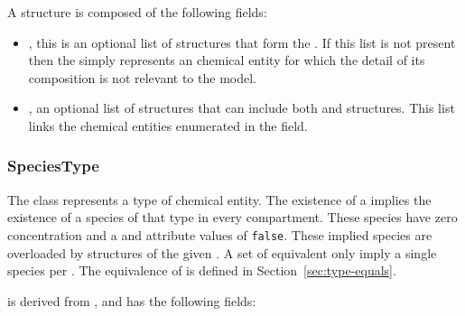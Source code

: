 \documentclass{cekarticle}
\begin{document}
A  structure is composed of the following fields:

\begin{itemize}

\item {}, this is an optional list of 
structures that form the .  If this list is not present
then the  simply represents an chemical entity for which the detail
of its composition is not relevant to the model.

\item {}, an optional list of  structures
that can include both  and 
structures. This list links the chemical entities enumerated in
the  field.

\end{itemize}

\subsubsection{SpeciesType}

\label{sec:class-speciestype}

The class  represents a type of chemical
entity. The existence of a  implies the
existence of a species of that type in every compartment. These
species have zero concentration and a  and
 attribute values of \texttt{false}. These
implied species are overloaded by  structures of
the given .  A set of equivalent
 only imply a single species per
.  The equivalence of  is
defined in Section~\ref{sec:type-equals}.

 is derived from , and has
the following fields:
\end{document}
